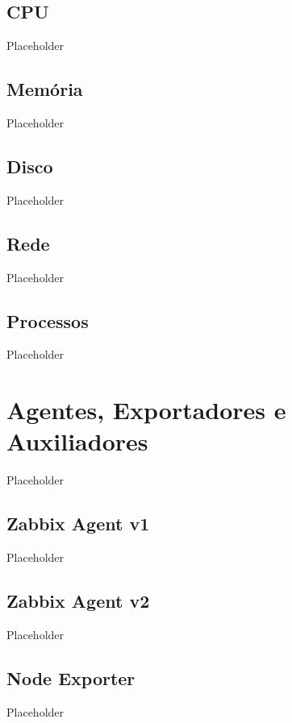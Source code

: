 \subsection{CPU}
\label{subsection:CPU}

Placeholder

\subsection{Memória}
\label{subsection:Memoria}
Placeholder

\subsection{Disco}
\label{subsection:Disco}

Placeholder
\subsection{Rede}
\label{subsection:Rede}
Placeholder
\subsection{Processos}
\label{subsection:Processos}
Placeholder

\section{Agentes, Exportadores e Auxiliadores}
\label{section:Agentes}

Placeholder

\subsection{Zabbix Agent v1}
\label{subsection:ZabbixAgentV1}

Placeholder

\subsection{Zabbix Agent v2}
\label{subsection:ZabbixAgentV2}

Placeholder

\subsection{Node Exporter}
\label{subsection:NodeExporter}

Placeholder

